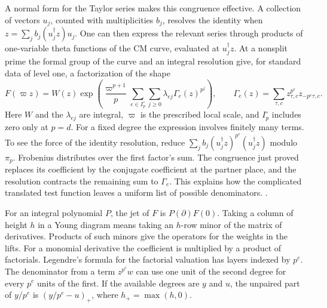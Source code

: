 A normal form for the Taylor series makes this congruence effective. A collection of vectors \(u_j\), counted with multiplicities \(b_j\), resolves the identity when \(z=\sum_j b_j(u_j^\dagger z)u_j\). One can then express the relevant series through products of one-variable theta functions of the CM curve, evaluated at \(u_j^\dagger z\). At a nonsplit prime the formal group of the curve and an integral resolution give, for standard data of level one, a factorization of the shape
\[
 F(\varpi z)=W(z)\exp\!\left(\frac{\varpi^{p+1}}p
        \sum_{e\in I_p^\circ}\sum_{j\ge0}
                    \lambda_{ej}\Gamma_e(z)^{p^j}\right),
 \qquad \Gamma_e(z)=\sum_{\tau,c}z_{\tau,c}^{p^e}z_{-p^e\tau,c}.
\]
Here \(W\) and the \(\lambda_{ej}\) are integral, \(\varpi\) is the prescribed local scale, and \(I_p^\circ\) includes zero only at \(p=d\). For a fixed degree the expression involves finitely many terms. To see the force of the identity resolution, reduce \(\sum_j b_j(u_j^\dagger z)^{p^e}(u_j^\dagger z)\) modulo \(\pi_p\). Frobenius distributes over the first factor's sum. The congruence just proved replaces its coefficient by the conjugate coefficient at the partner place, and the resolution contracts the remaining sum to \(\Gamma_e\). This explains how the complicated translated test function leaves a uniform list of possible denominators. .

For an integral polynomial \(P\), the jet of \(F\) is \(P(\partial)F(0)\). Taking a column of height \(h\) in a Young diagram means taking an \(h\)-row minor of the matrix of derivatives. Products of such minors give the operators for the weights in the lifts. For a monomial derivative the coefficient is multiplied by a product of factorials. Legendre's formula for the factorial valuation has layers indexed by \(p^e\). The denominator from a term \(z^{p^e}w\) can use one unit of the second degree for every \(p^e\) units of the first. If the available degrees are \(y\) and \(u\), the unpaired part of \(y/p^e\) is \((y/p^e-u)_+\), where \(h_+=\max(h,0)\).

